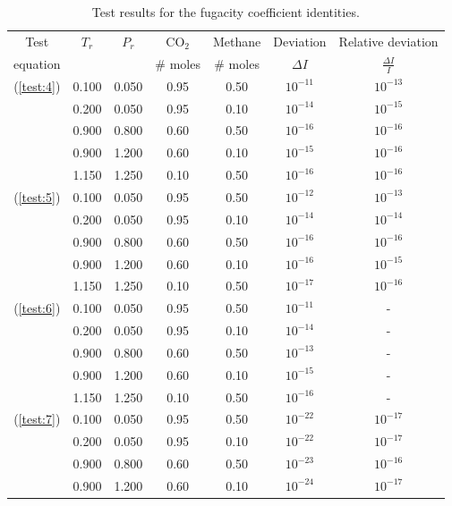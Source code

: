 \documentclass[internal,english]{sintefmemo2012}
\numberwithin{equation}{section}
\newcommand*{\reff}[1]{(\ref{#1})}
\begin{document}
\begin{table}[h!]
  \centering
    \caption{Test results for the fugacity coefficient identities.}
    \label{tab:testFugacity}
    \begin{tabular}{c c c c c c c}
      \hline
      Test 			& $T_r$ & $P_r$ & CO$_2$	& Methane	& Deviation		& Relative deviation\\
      equation		&		&		& \# moles	& \# moles	& $\Delta I$		& $\frac{\Delta I}{I}$\\
      \hline
      \reff{test:4}	& 0.100	& 0.050	& 0.95		&0.50		& $10^{-11}$	& $10^{-13}$	\\
      				& 0.200	& 0.050	& 0.95		&0.10		& $10^{-14}$	& $10^{-15}$	\\
      				& 0.900	& 0.800	& 0.60		&0.50		& $10^{-16}$	& $10^{-16}$	\\	
      				& 0.900	& 1.200	& 0.60		&0.10		& $10^{-15}$	& $10^{-16}$	\\
      				& 1.150	& 1.250	& 0.10		&0.50		& $10^{-16}$	& $10^{-16}$	\\
      \reff{test:5}	& 0.100	& 0.050	& 0.95		&0.50		& $10^{-12}$	& $10^{-13}$	\\
      				& 0.200	& 0.050	& 0.95		&0.10		& $10^{-14}$	& $10^{-14}$	\\
      				& 0.900	& 0.800	& 0.60		&0.50		& $10^{-16}$	& $10^{-16}$	\\
      				& 0.900	& 1.200	& 0.60		&0.10		& $10^{-16}$	& $10^{-15}$	\\
      				& 1.150	& 1.250	& 0.10		&0.50		& $10^{-17}$	& $10^{-16}$	\\
      \reff{test:6}	& 0.100	& 0.050	& 0.95		&0.50		& $10^{-11}$	& - 	\\
      				& 0.200	& 0.050	& 0.95		&0.10		& $10^{-14}$	& - 	\\
      				& 0.900	& 0.800	& 0.60		&0.50		& $10^{-13}$	& - 	\\
      				& 0.900	& 1.200	& 0.60		&0.10		& $10^{-15}$	& -		\\
      				& 1.150	& 1.250	& 0.10		&0.50		& $10^{-16}$	& - 	\\
      \reff{test:7}	& 0.100	& 0.050	& 0.95		&0.50		& $10^{-22}$	&  $10^{-17}$	\\
      				& 0.200	& 0.050	& 0.95		&0.10		& $10^{-22}$	&  $10^{-17}$ 	\\
      				& 0.900	& 0.800	& 0.60		&0.50		& $10^{-23}$	&  $10^{-16}$	\\
      				& 0.900	& 1.200	& 0.60		&0.10		& $10^{-24}$	&  $10^{-17}$	\\

\end{tabular}
\end{table}
\end{document}
